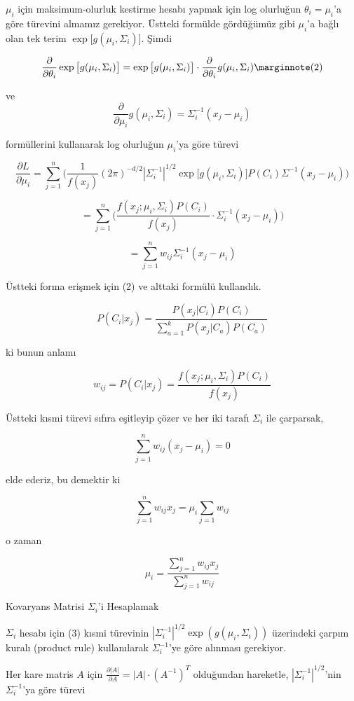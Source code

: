 \documentclass[12pt,fleqn]{article}\usepackage{../../common}
\begin{document}
$\mu_i$ için maksimum-olurluk kestirme hesabı yapmak için log olurluğun
$\theta_i=\mu_i$'a göre türevini almamız gerekiyor. Üstteki formülde
gördüğümüz gibi $\mu_i$'a bağlı olan tek terim $\exp\big[ g(\mu_i,\Sigma_i)
\big]$. Şimdi 

$$ 
\frac{\partial }{\partial \theta_i} \exp \big[ g(\mu_i,\Sigma_i) \big] =
\exp \big[ g(\mu_i,\Sigma_i) \big] \cdot 
\frac{\partial }{\partial \theta_i} g(\mu_i,\Sigma_i)
\mlabel{2}
$$

ve
$$ \frac{\partial }{\partial \mu_i}g(\mu_i,\Sigma_i) = 
\Sigma_i^{-1}(x_j-\mu_i)
$$

formüllerini kullanarak log olurluğun $\mu_i$'ya göre türevi

$$ \frac{\partial L}{\partial \mu_i} = 
\sum _{j=1}^{n} \bigg(
\frac{1}{f(x_j)} 
(2\pi)^{-d/2} |\Sigma_i^{-1}|^{1/2} \exp\big[ 
g(\mu_i,\Sigma_i) \big] P(C_i) \Sigma^{-1} 
(x_j-\mu_i)
\bigg)
$$

$$ 
= \sum _{j=1}^{n} \bigg(
\frac{f(x_j;\mu_i,\Sigma_i)P(C_i)}{f(x_j)} \cdot 
\Sigma_i^{-1} (x_j-\mu_i)
\bigg)
$$

$$ =
\sum _{j=1}^{n} w_{ij} \Sigma_i^{-1}(x_j-\mu_i)
$$

Üstteki forma erişmek için (2) ve alttaki formülü kullandık.

$$ P(C_i|x_j) = \frac{P(x_j|C_i)P(C_i)}{\sum _{a=1}^{k}P(x_j|C_a)P(C_a)}$$

ki bunun anlamı

$$ w_{ij} = P(C_i|x_j) = \frac{f(x_j;\mu_i,\Sigma_i)P(C_i)}{f(x_j)}$$

Üstteki kısmi türevi sıfıra eşitleyip çözer ve her iki tarafı $\Sigma_i$
ile çarparsak, 

$$ \sum _{j=1}^{n} w_{ij} (x_j-\mu_i) = 0 $$

elde ederiz, bu demektir ki 

$$ \sum _{j=1}^{n} w_{ij}x_j = \mu_i\sum _{j=1} w_{ij}  $$

o zaman 

$$ \mu_i = \frac{\sum _{j=1}^{n} w_{ij}x_j}{\sum _{j=1}^{n} w_{ij}}$$

Kovaryans Matrisi $\Sigma_i$'i Hesaplamak

$\Sigma_i$ hesabı için (3) kısmi türevinin $|\Sigma_i^{-1}|^{1/2}
\exp(g(\mu_i,\Sigma_i))$ üzerindeki çarpım 
kuralı (product rule) kullanılarak $\Sigma_i^{-1}$'ye göre alınması gerekiyor.

Her kare matris $A$ için $\frac{\partial |A|}{\partial A} = |A| \cdot
(A^{-1})^T$ olduğundan hareketle, $|\Sigma_i^{-1}|^{1/2}$'nin
$\Sigma_i^{-1}$'ya göre türevi  
\end{document}
